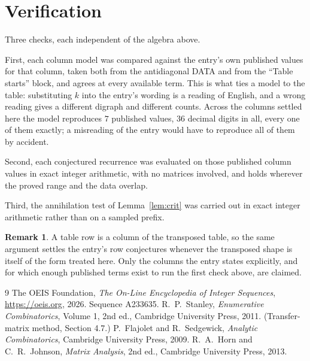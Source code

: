 \documentclass[11pt,a4paper]{article}
\theoremstyle{plain}
\theoremstyle{definition}
\newtheorem{remark}[theorem]{Remark}
\begin{document}
\section{Verification}

Three checks, each independent of the algebra above.

First, each column model was compared against the entry's own published values for that
column, taken both from the antidiagonal DATA and from the ``Table starts'' block, and agrees
at every available term. This is what ties a model to the table: substituting $k$ into the
entry's wording is a reading of English, and a wrong reading gives a different digraph and
different counts. Across the columns settled here the model reproduces $7$ published
values, $36$ decimal digits in all, every one of them exactly; a misreading of the entry
would have to reproduce all of them by accident.

Second, each conjectured recurrence was evaluated on those published column values in exact
integer arithmetic, with no matrices involved, and holds wherever the proved range and the
data overlap.

Third, the annihilation test of Lemma~\ref{lem:crit} was carried out in exact integer
arithmetic rather than on a sampled prefix.

\begin{remark}
A table row is a column of the transposed table, so the same argument settles the entry's row
conjectures whenever the transposed shape is itself of the form treated here. Only the columns
the entry states explicitly, and for which enough published terms exist to run the first check
above, are claimed.
\end{remark}

\begin{thebibliography}{9}
 The OEIS Foundation, \emph{The On-Line Encyclopedia of Integer
Sequences}, \url{https://oeis.org}, 2026. Sequence A233635.
 R.~P.~Stanley, \emph{Enumerative Combinatorics}, Volume 1, 2nd ed.,
Cambridge University Press, 2011. (Transfer-matrix method, Section 4.7.)
 P.~Flajolet and R.~Sedgewick, \emph{Analytic Combinatorics}, Cambridge
University Press, 2009.
 R.~A.~Horn and C.~R.~Johnson, \emph{Matrix Analysis}, 2nd ed., Cambridge
University Press, 2013.
\end{thebibliography}
\end{document}
